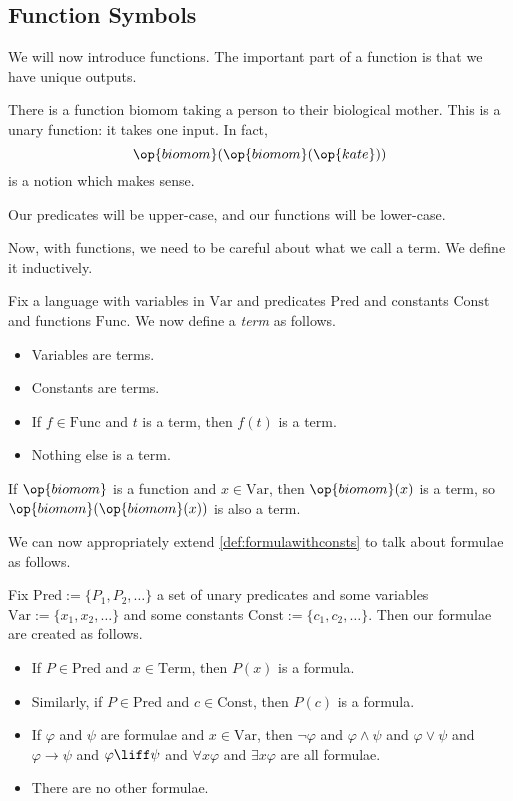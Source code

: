 \subsection{Function Symbols}
We will now introduce functions. The important part of a function is that we have unique outputs.
\begin{example}
	There is a function $\mathrm{biomom}$ taking a person to their biological mother. This is a unary function: it takes one input. In fact,
	\[\op{biomom}(\op{biomom}(\op{kate}))\]
	is a notion which makes sense.
\end{example}
\begin{remark}
	Our predicates will be upper-case, and our functions will be lower-case.
\end{remark}
Now, with functions, we need to be careful about what we call a term. We define it inductively.
\begin{definition}
	Fix a language with variables in $\mathrm{Var}$ and predicates $\mathrm{Pred}$ and constants $\mathrm{Const}$ and functions $\mathrm{Func}$. We now define a \textit{term} as follows.
	\begin{itemize}
		\item Variables are terms.
		\item Constants are terms.
		\item If $f\in\mathrm{Func}$ and $t$ is a term, then $f(t)$ is a term.
		\item Nothing else is a term.
	\end{itemize}
\end{definition}
\begin{example}
	If $\op{biomom}$ is a function and $x\in\mathrm{Var}$, then $\op{biomom}(x)$ is a term, so $\op{biomom}(\op{biomom}(x))$ is also a term.
\end{example}
We can now appropriately extend \autoref{def:formulawithconsts} to talk about formulae as follows.
\begin{defihelper}
	Fix $\mathrm{Pred}:=\{P_1,P_2,\ldots\}$ a set of unary predicates and some variables $\mathrm{Var}:=\{x_1,x_2,\ldots\}$ and some constants $\mathrm{Const}:=\{c_1,c_2,\ldots\}$. Then our formulae are created as follows.
	\begin{itemize}
		\item If $P\in\mathrm{Pred}$ and $x\in\mathrm{Term}$, then $P(x)$ is a formula.
		\item Similarly, if $P\in\mathrm{Pred}$ and $c\in\mathrm{Const}$, then $P(c)$ is a formula.
		\item If $\varphi$ and $\psi$ are formulae and $x\in\mathrm{Var}$, then $\lnot\varphi$ and $\varphi\land\psi$ and $\varphi\lor\psi$ and $\varphi\to\psi$ and $\varphi\liff\psi$ and $\forall x\varphi$ and $\exists x\varphi$ are all formulae.
		\item There are no other formulae.
	\end{itemize}
\end{defihelper}
